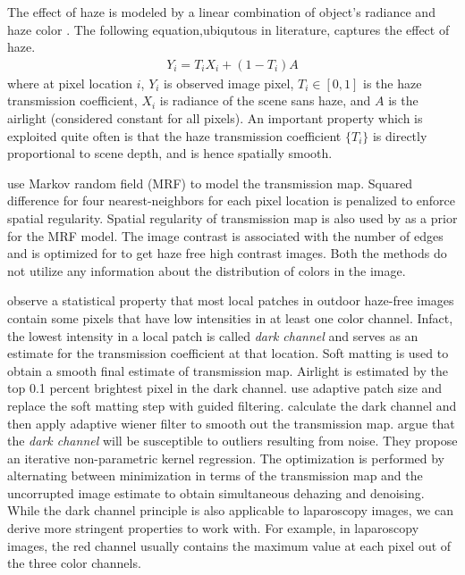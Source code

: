 The effect of haze is modeled by a linear combination of object's radiance and haze color \cite{koschmieder1925smokemodel}. The following equation,ubiqutous in literature, captures the effect of haze.
\begin{align}
    Y_i = T_i X_i + \left( 1 - T_i \right) A \label{eqn:hazemodel}
\end{align}
where at pixel location $i$, $Y_i$ is observed image pixel, $T_i \in [0, 1]$ is the haze transmission coefficient, $X_i$ is radiance of the scene sans haze, and $A$ is the airlight (considered constant for all pixels). An important property which is exploited quite often is that the haze transmission coefficient $\lbrace T_i \rbrace$ is directly proportional to scene depth, and is hence spatially smooth.

\cite{fattal2008single} use Markov random field (MRF) to model the transmission map. Squared difference for four nearest-neighbors for each pixel location is penalized to enforce spatial regularity. Spatial regularity of transmission map is also used by \cite{tan2008visibility} as a prior for the MRF model. The image contrast is associated with the number of edges and is optimized for to get haze free high contrast images. Both the methods do not utilize any information about the distribution of colors in the image.

\cite{he2011dark} observe a statistical property that most local patches in outdoor haze-free images contain some pixels that have low intensities in at least one color channel. Infact, the lowest intensity in a local patch is called \emph{dark channel} and serves as an estimate for the transmission coefficient at that location. Soft matting is used to obtain a smooth final estimate of transmission map. Airlight is estimated by the top 0.1 percent brightest pixel in the dark channel. \cite{pang2011improved} use adaptive patch size and replace the soft matting step with guided filtering. \cite{gibson2013wiener} calculate the dark channel and then apply adaptive wiener filter to smooth out the transmission map. \cite{matlin2012removal} argue that the \textit{dark channel} will be susceptible to outliers resulting from noise. They propose an iterative non-parametric kernel regression. The optimization is performed by alternating between minimization in terms of the transmission map and the uncorrupted image estimate to obtain simultaneous dehazing and denoising. While the dark channel principle is also applicable to laparoscopy images, we can derive more stringent properties to work with. For example, in laparoscopy images, the red channel usually contains the maximum value at each pixel out of the three color channels. 

